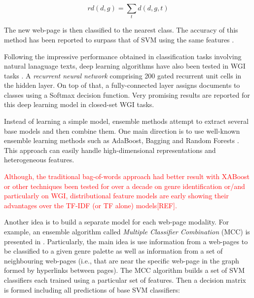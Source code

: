 \begin{equation}\label{eq:ranking_distance_sum}
	rd(d,g) = \sum_{t} d(d,g,t)
\end{equation}

The new web-page is then classified to the nearest class. The accuracy of this method has been reported to surpass that of SVM using the same features \parencite{waltinger2010feature}.

Following the impressive performance obtained in classification tasks involving natural lanaguage texts, deep learning algorithms have also been tested in WGI tasks \parencite{strobel2018text}. A \textit{recurrent neural network} comprising 200 gated recurrent unit cells in the hidden layer. On top of that, a fully-connected layer assigns documents to classes using a Softmax decision function. Very promising results are reported for this deep learning model in closed-set WGI tasks.

Instead of learning a simple model, ensemble methods attempt to extract several base models and then combine them. One main direction is to use well-known ensemble learning methods such as AdaBoost, Bagging and Random Forests \parencite{sugiyanto2014term,onan2018ensemble}. This approach can easily handle high-dimensional representations and heterogeneous features.

\textcolor{red}{Although, the traditional bag-of-words approach had better result with XABoost or other techniques been tested for over a decade on genre identification or/and particularly on WGI, distributional feature models are early showing their advantages over the TF-IDF (or TF alone) models[REF].}


Another idea is to build a separate model for each web-page modality. For example, an ensemble algorithm called \textit{Multiple Classifier Combination} (MCC) is presented in . Particularly, the main idea is use information from a web-pages to be classified to a given genre palette as well as information from a set of neighbouring web-pages (i.e., that are near the specific web-page in the graph formed by hyperlinks between pages). The MCC algorithm builds a set of SVM classifiers each trained using a particular set of features. Then a decision matrix is formed including all predictions of base SVM classifiers:

